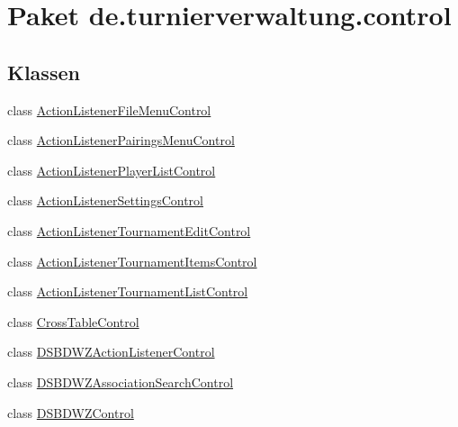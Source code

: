 \hypertarget{namespacede_1_1turnierverwaltung_1_1control}{}\section{Paket de.\+turnierverwaltung.\+control}
\label{namespacede_1_1turnierverwaltung_1_1control}
\subsection*{Klassen}
\begin{DoxyCompactItemize}
\item 
class \hyperlink{classde_1_1turnierverwaltung_1_1control_1_1_action_listener_file_menu_control}{Action\+Listener\+File\+Menu\+Control}
\item 
class \hyperlink{classde_1_1turnierverwaltung_1_1control_1_1_action_listener_pairings_menu_control}{Action\+Listener\+Pairings\+Menu\+Control}
\item 
class \hyperlink{classde_1_1turnierverwaltung_1_1control_1_1_action_listener_player_list_control}{Action\+Listener\+Player\+List\+Control}
\item 
class \hyperlink{classde_1_1turnierverwaltung_1_1control_1_1_action_listener_settings_control}{Action\+Listener\+Settings\+Control}
\item 
class \hyperlink{classde_1_1turnierverwaltung_1_1control_1_1_action_listener_tournament_edit_control}{Action\+Listener\+Tournament\+Edit\+Control}
\item 
class \hyperlink{classde_1_1turnierverwaltung_1_1control_1_1_action_listener_tournament_items_control}{Action\+Listener\+Tournament\+Items\+Control}
\item 
class \hyperlink{classde_1_1turnierverwaltung_1_1control_1_1_action_listener_tournament_list_control}{Action\+Listener\+Tournament\+List\+Control}
\item 
class \hyperlink{classde_1_1turnierverwaltung_1_1control_1_1_cross_table_control}{Cross\+Table\+Control}
\item 
class \hyperlink{classde_1_1turnierverwaltung_1_1control_1_1_d_s_b_d_w_z_action_listener_control}{D\+S\+B\+D\+W\+Z\+Action\+Listener\+Control}
\item 
class \hyperlink{classde_1_1turnierverwaltung_1_1control_1_1_d_s_b_d_w_z_association_search_control}{D\+S\+B\+D\+W\+Z\+Association\+Search\+Control}
\item 
class \hyperlink{classde_1_1turnierverwaltung_1_1control_1_1_d_s_b_d_w_z_control}{D\+S\+B\+D\+W\+Z\+Control}

\end{DoxyCompactItemize}
